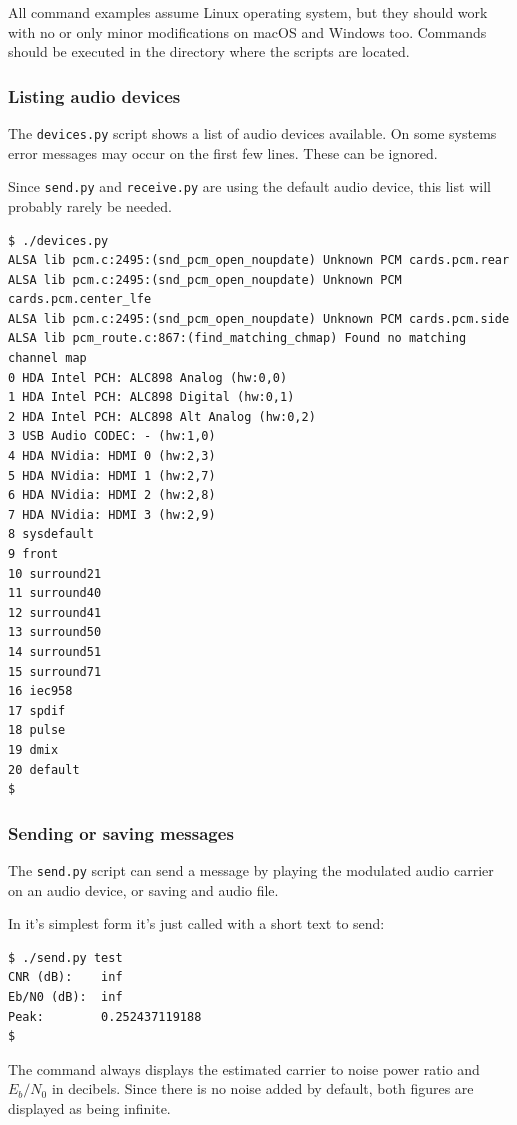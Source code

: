 \documentclass[a4paper]{article}
\begin{document}
All command examples assume Linux operating system, but they should 
work with no or only minor modifications on macOS and Windows too. 
Commands should be executed in the directory where the scripts are 
located.

\subsubsection{Listing audio devices}

The \texttt{devices.py} script shows a list of audio devices available. 
On some systems error messages may occur on the first few lines. These 
can be ignored.

Since \texttt{send.py} and \texttt{receive.py} are using the default 
audio device, this list will probably rarely be needed.

\newpage

\begin{lstlisting}
$ ./devices.py 
ALSA lib pcm.c:2495:(snd_pcm_open_noupdate) Unknown PCM cards.pcm.rear
ALSA lib pcm.c:2495:(snd_pcm_open_noupdate) Unknown PCM
cards.pcm.center_lfe
ALSA lib pcm.c:2495:(snd_pcm_open_noupdate) Unknown PCM cards.pcm.side
ALSA lib pcm_route.c:867:(find_matching_chmap) Found no matching
channel map
0 HDA Intel PCH: ALC898 Analog (hw:0,0)
1 HDA Intel PCH: ALC898 Digital (hw:0,1)
2 HDA Intel PCH: ALC898 Alt Analog (hw:0,2)
3 USB Audio CODEC: - (hw:1,0)
4 HDA NVidia: HDMI 0 (hw:2,3)
5 HDA NVidia: HDMI 1 (hw:2,7)
6 HDA NVidia: HDMI 2 (hw:2,8)
7 HDA NVidia: HDMI 3 (hw:2,9)
8 sysdefault
9 front
10 surround21
11 surround40
12 surround41
13 surround50
14 surround51
15 surround71
16 iec958
17 spdif
18 pulse
19 dmix
20 default
$
\end{lstlisting}

\subsubsection{Sending or saving messages}

The \texttt{send.py} script can send a message by playing the modulated
audio carrier on an audio device, or saving and audio file.

In it's simplest form it's just called with a short text to send:

\begin{lstlisting}
$ ./send.py test
CNR (dB):    inf
Eb/N0 (dB):  inf
Peak:        0.252437119188
$
\end{lstlisting}

The command always displays the estimated carrier to noise power ratio 
and $E_b/N_0$ in decibels. Since there is no noise added by default, 
both figures are displayed as being infinite.
\end{document}
